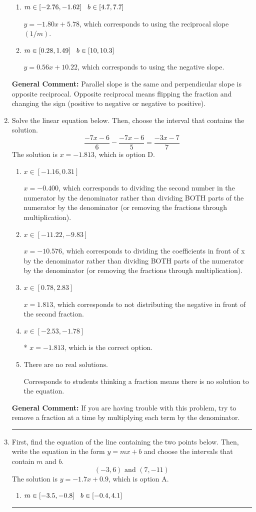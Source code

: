 \documentclass{extbook}[14pt]
\newcommand{\litem}[1]{\item #1

\rule{\textwidth}{0.4pt}}
\begin{document}
\begin{enumerate}
{\begin{enumerate}[label=\Alph*.]
 $y = -0.56x - 5.78$, which corresponds to using the correct slope and getting the negative $y$-intercept.
\item \( m \in [-2.76, -1.62] \hspace*{3mm} b \in [4.7, 7.7] \)

 $y = -1.80x + 5.78$, which corresponds to using the reciprocal slope $(1/m)$.
\item \( m \in [0.28, 1.49] \hspace*{3mm} b \in [10, 10.3] \)

 $y = 0.56x + 10.22$, which corresponds to using the negative slope.
\end{enumerate}

\textbf{General Comment:} Parallel slope is the same and perpendicular slope is opposite reciprocal. Opposite reciprocal means flipping the fraction and changing the sign (positive to negative or negative to positive).
}
\litem{
Solve the linear equation below. Then, choose the interval that contains the solution.
\[ \frac{-7x -6}{6} - \frac{-7x -6}{5} = \frac{-3x -7}{7} \]The solution is \( x = -1.813 \), which is option D.\begin{enumerate}[label=\Alph*.]
\item \( x \in [-1.16, 0.31] \)

 $x = -0.400$, which corresponds to dividing the second number in the numerator by the denominator rather than dividing BOTH parts of the numerator by the denominator (or removing the fractions through multiplication).
\item \( x \in [-11.22, -9.83] \)

 $x = -10.576$, which corresponds to dividing the coefficients in front of x by the denominator rather than dividing BOTH parts of the numerator by the denominator (or removing the fractions through multiplication).
\item \( x \in [0.78, 2.83] \)

 $x = 1.813$, which corresponds to not distributing the negative in front of the second fraction.
\item \( x \in [-2.53, -1.78] \)

* $x = -1.813$, which is the correct option.
\item \( \text{There are no real solutions.} \)

Corresponds to students thinking a fraction means there is no solution to the equation.
\end{enumerate}

\textbf{General Comment:} If you are having trouble with this problem, try to remove a fraction at a time by multiplying each term by the denominator.
}
\litem{
First, find the equation of the line containing the two points below. Then, write the equation in the form $ y=mx+b $ and choose the intervals that contain $m$ and $b$.
\[ (-3, 6) \text{ and } (7, -11) \]The solution is \( y = -1.7x + 0.9 \), which is option A.\begin{enumerate}[label=\Alph*.]
\item \( m \in [-3.5, -0.8] \hspace*{3mm} b \in [-0.4, 4.1] \)


\end{enumerate}}
\end{enumerate}
\end{document}
